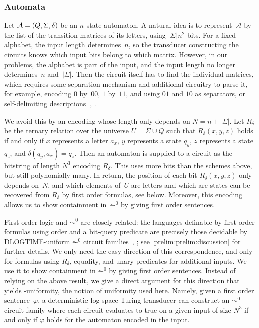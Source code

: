 \subsubsection{Automata}

Let $\mathcal A = (Q, \Sigma, \delta)$ be an $n$-state automaton.
A natural idea is to represent~$\mathcal A$ by the list of the transition matrices of its letters,
using $|\Sigma| n^2$ bits.
For a fixed alphabet, the input length determines~$n$,
so the transducer constructing the circuits knows which input bits belong to which matrix.
However, in our problems, the alphabet is part of the input,
and the input length no longer determines~$n$ and~$|\Sigma|$.
Then the circuit itself has to find the individual matrices,
which requires some separation mechanism and additional circuitry to parse it,
for example, encoding $0$ by~$00$, $1$ by~$11$, and using $01$ and $10$ as separators,
or self-delimiting descriptions~\cite[Sect.~1.4]{LiVitanyi2019}, \cite[Sect.~2.2]{LiVitanyi1990}.

We avoid this by an encoding whose length only depends on $N = n + |\Sigma|$.
Let $R_{\delta}$ be the ternary relation
over the universe $U = \Sigma \cup Q$
such that $R_{\delta}(x,y,z)$ holds if and only if $x$ represents a letter $a_x$,
$y$ represents a state $q_y$, $z$ represents a state $q_z$, and $\delta(q_y, a_x) = q_z$.
Then an automaton is supplied to a circuit as the bitstring of length $N^3$ encoding $R_{\delta}$.
This uses more bits than the schemes above, but still polynomially many.
In return, the position of each bit $R_{\delta}(x,y,z)$ only depends on~$N$,
and which elements of~$U$ are letters and which are states
can be recovered from $R_{\delta}$ by first order formulas, see below.
Moreover, this encoding allows us to show containment in~$\AC^0$
by giving first order sentences.

First order logic and $\AC^0$ are closely related:
the languages definable by first order formulas
using order and a bit-query predicate
are precisely those decidable by DLOGTIME-uniform $\AC^0$ circuit families~\cite{BarringtonIS90},
\cite[Thm.~5.22]{DBLP:books/daglib/0095988};
see \cref{prelim:prelim:discussion} for further details.
We only need the easy direction of this correspondence,
and only for formulas using $R_{\delta}$, equality, and unary predicates for additional inputs.
We use it to show containment in $\AC^0$ by giving first order sentences.
Instead of relying on the above result,
we give a direct argument for this direction
that yields \LOGSPACE-uniformity, the notion of uniformity used here.
Namely, given a first order sentence~$\varphi$,
a deterministic log-space Turing transducer can construct an $\AC^0$ circuit family
where each circuit evaluates to true on a given input of size $N^3$ if and only if
$\varphi$ holds for the automaton encoded in the input.

